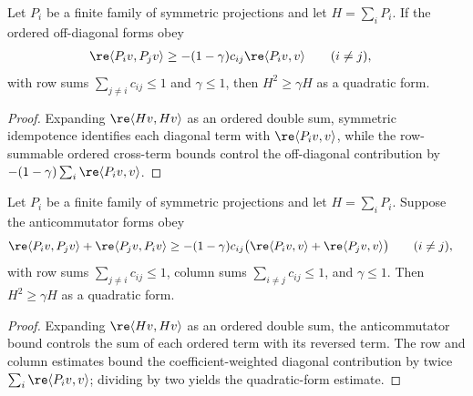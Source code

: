 \begin{lemma}
    \label{lem:ordered_projection_rowsum_reduction}
    \leanok
    Let $P_i$ be a finite family of symmetric projections and let
    $H=\sum_iP_i$. If the ordered off-diagonal forms obey
    \begin{align}
        \re\langle P_i v,P_j v\rangle
         & \ge-(1-\gamma)c_{ij}\re\langle P_i v,v\rangle
        \qquad (i\ne j), \notag
    \end{align}
    with row sums $\sum_{j\ne i}c_{ij}\le1$ and $\gamma\le1$, then
    $H^2\ge\gamma H$ as a quadratic form.
\end{lemma}

\begin{proof}
    \leanok
    Expanding $\re\langle Hv,Hv\rangle$ as an ordered double sum,
    symmetric idempotence identifies each diagonal term with
    $\re\langle P_i v,v\rangle$, while the row-summable ordered
    cross-term bounds control the off-diagonal contribution by
    $-(1-\gamma)\sum_i\re\langle P_i v,v\rangle$.
\end{proof}

\begin{lemma}
    \label{lem:anticommutator_projection_rowsum_reduction}
    \leanok
    Let $P_i$ be a finite family of symmetric projections and let
    $H=\sum_iP_i$. Suppose the anticommutator forms obey
    \begin{align}
        \re\langle P_i v,P_jv\rangle
        +\re\langle P_j v,P_iv\rangle
         & \ge-(1-\gamma)c_{ij}
        \bigl(\re\langle P_i v,v\rangle
        +\re\langle P_j v,v\rangle\bigr)
        \qquad (i\ne j), \notag
    \end{align}
    with row sums $\sum_{j\ne i}c_{ij}\le1$, column sums
    $\sum_{i\ne j}c_{ij}\le1$, and $\gamma\le1$. Then
    $H^2\ge\gamma H$ as a quadratic form.
\end{lemma}

\begin{proof}
    \leanok
    Expanding $\re\langle Hv,Hv\rangle$ as an ordered double sum, the
    anticommutator bound controls the sum of each ordered term with its reversed
    term. The row and column estimates bound the coefficient-weighted diagonal
    contribution by twice $\sum_i\re\langle P_i v,v\rangle$; dividing by two
    yields the quadratic-form estimate.
\end{proof}

